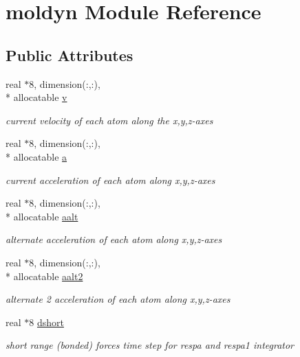 \hypertarget{classmoldyn}{\section{moldyn Module Reference}
\label{classmoldyn}
}
\subsection*{Public Attributes}
\begin{DoxyCompactItemize}
\item 
real $\ast$8, dimension(\-:,\-:), \\*
allocatable \hyperlink{classmoldyn_a9b6e981d143cad48fcc41f194e8b826d}{v}
\begin{DoxyCompactList}\small\item\em current velocity of each atom along the x,y,z-\/axes \end{DoxyCompactList}\item 
real $\ast$8, dimension(\-:,\-:), \\*
allocatable \hyperlink{classmoldyn_ae8b981427504a1afaa1a90aeb47d29d3}{a}
\begin{DoxyCompactList}\small\item\em current acceleration of each atom along x,y,z-\/axes \end{DoxyCompactList}\item 
real $\ast$8, dimension(\-:,\-:), \\*
allocatable \hyperlink{classmoldyn_ac63436eccf763211939d5388e0803f24}{aalt}
\begin{DoxyCompactList}\small\item\em alternate acceleration of each atom along x,y,z-\/axes \end{DoxyCompactList}\item 
real $\ast$8, dimension(\-:,\-:), \\*
allocatable \hyperlink{classmoldyn_a02162eed7467865a18a4b4aec93f7029}{aalt2}
\begin{DoxyCompactList}\small\item\em alternate 2 acceleration of each atom along x,y,z-\/axes \end{DoxyCompactList}\item 
real $\ast$8 \hyperlink{classmoldyn_ac40f2c232407c85a02169ad2692ab755}{dshort}
\begin{DoxyCompactList}\small\item\em short range (bonded) forces time step for respa and respa1 integrator \end{DoxyCompactList}\item 

\end{DoxyCompactItemize}
